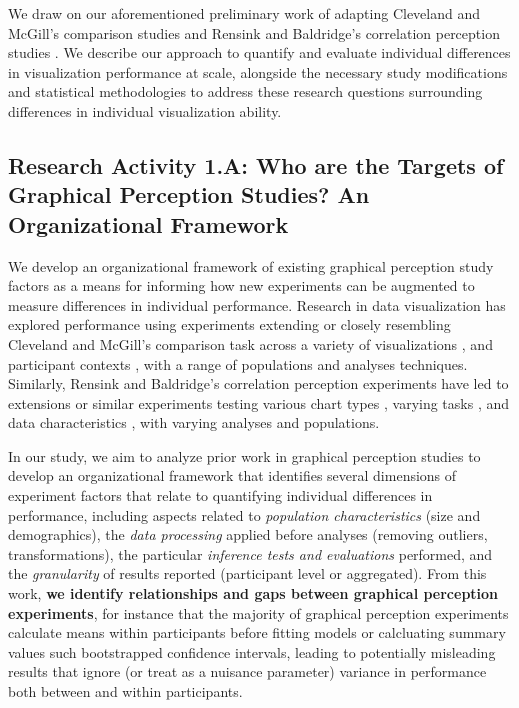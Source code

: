 \documentclass[11pt]{article}
\begin{document}
\vspace{-1.0em}
\noindent\hrulefill

We draw on our aforementioned preliminary work of adapting Cleveland and McGill's comparison studies and Rensink and Baldridge's correlation perception studies \cite{harrison2014ranking, harrison2013influencing, kay2016beyond}.
We describe our approach to quantify and evaluate individual differences in visualization performance at scale, alongside the necessary study modifications and statistical methodologies to address these research questions surrounding differences in individual visualization ability.

\subsection{Research Activity 1.A: Who are the Targets of Graphical Perception Studies? An Organizational Framework}
\figraone

We develop an organizational framework of existing graphical perception study factors as a means for informing how new experiments can be augmented to measure differences in individual performance.
Research in data visualization has explored performance using experiments extending or closely resembling Cleveland and McGill's comparison task across a variety of visualizations \cite{talbot2014four, heer2010crowdsourcing, kong2010perceptual, simkin1987information, cleveland1984graphical}, and participant contexts \cite{hullman2011impact, harrison2013influencing}, with a range of populations and analyses techniques.
Similarly, Rensink and Baldridge's correlation perception experiments have led to extensions or similar experiments testing various chart types \cite{harrison2014ranking, rensink2016nature, elliott2015interference}, varying tasks \cite{beecham2017map, correll2017regression}, and data characteristics \cite{sher2017empirical, rensink2016entropy}, with varying analyses and populations.

In our study, we aim to analyze prior work in graphical perception studies to develop an organizational framework that identifies several dimensions of experiment factors that relate to quantifying individual differences in performance, including aspects related to \emph{population characteristics} (\eg size and demographics), the \emph{data processing} applied before analyses (\eg removing outliers, transformations), the particular \emph{inference tests and evaluations} performed, and the \emph{granularity} of results reported (\eg participant level or aggregated). From this work, \textbf{we identify relationships and gaps between graphical perception experiments}, for instance that the majority of graphical perception experiments calculate means within participants before fitting models or calcluating summary values such bootstrapped confidence intervals, leading to potentially misleading results that ignore (or treat as a nuisance parameter) variance in performance both between and within participants.
\end{document}
